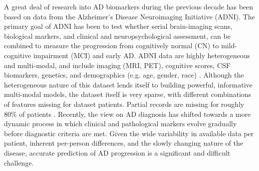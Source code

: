 \documentclass{article}
\begin{document}

A great deal of research into AD biomarkers during the previous decade has been based on data from the Alzheimer’s Disease Neuroimaging Initiative (ADNI)\cite{weiner2017}. The primary goal of ADNI has been to test whether serial brain-imaging scans, biological markers, and clinical and neuropsychological assessment, can be combined to measure the progression from cognitively normal (CN) to mild-cognitive impairment (MCI) and early AD. ADNI data are highly heterogeneous and multi-modal, and include imaging (MRI, PET), cognitive scores, CSF biomarkers, genetics, and demographics (e.g. age, gender, race) \citep{tadpole2017}. Although the heterogeneous nature of this dataset lends itself to building powerful, informative multi-modal models, the dataset itself is very sparse, with different combinations of features missing for dataset patients. Partial records are missing for roughly $80\%$ of patients \citep{campos2015}. 
Recently, the view on AD diagnosis has shifted towards a more dynamic process in which clinical and pathological markers evolve gradually before diagnostic criteria are met.
Given the wide variability in available data per patient, inherent per-person differences, and the slowly changing nature of the disease, accurate prediction of AD progression is a significant and difficult challenge.  
\end{document}
